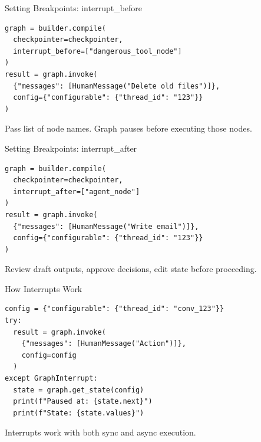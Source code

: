 \documentclass[aspectratio=169,11pt]{beamer}
\begin{document}
\begin{frame}[fragile]{Setting Breakpoints: interrupt\_before}
  \begin{codebox}
    \begin{lstlisting}
graph = builder.compile(
  checkpointer=checkpointer,
  interrupt_before=["dangerous_tool_node"]
)
result = graph.invoke(
  {"messages": [HumanMessage("Delete old files")]},
  config={"configurable": {"thread_id": "123"}}
)
    \end{lstlisting}
  \end{codebox}
  \vspace{0.1cm}
  \begin{tipbox}
    Pass list of node names. Graph pauses before executing those nodes.
  \end{tipbox}
\end{frame}

\begin{frame}[fragile]{Setting Breakpoints: interrupt\_after}
  \begin{codebox}
    \begin{lstlisting}
graph = builder.compile(
  checkpointer=checkpointer,
  interrupt_after=["agent_node"]
)
result = graph.invoke(
  {"messages": [HumanMessage("Write email")]},
  config={"configurable": {"thread_id": "123"}}
)
    \end{lstlisting}
  \end{codebox}
  \vspace{0.1cm}
  \begin{tipbox}
    Review draft outputs, approve decisions, edit state before proceeding.
  \end{tipbox}
\end{frame}

\begin{frame}[fragile]{How Interrupts Work}
  \begin{codebox}
    \begin{lstlisting}
config = {"configurable": {"thread_id": "conv_123"}}
try:
  result = graph.invoke(
    {"messages": [HumanMessage("Action")]},
    config=config
  )
except GraphInterrupt:
  state = graph.get_state(config)
  print(f"Paused at: {state.next}")
  print(f"State: {state.values}")
    \end{lstlisting}
  \end{codebox}
  \vspace{0.1cm}
  \begin{tipbox}
    Interrupts work with both sync and async execution.
  \end{tipbox}
\end{frame}
\end{document}
